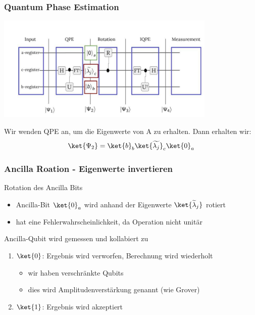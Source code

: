\begin{frame}
    \frametitle{Quantum Phase Estimation}
    \begin{center}
    \includegraphics[width=10.5cm]{img/hhl_circuit/hhl_circuit_2.jpg}
    \end{center}

    Wir wenden QPE an, um die Eigenwerte von A zu erhalten.
    Dann erhalten wir:
    $$\ket{\Psi_2} = \ket{b}_b \ket{\widetilde{\lambda_j}}_c\ket{0}_a$$


\end{frame}


\begin{frame}
    \frametitle{Ancilla Roation - Eigenwerte invertieren}

    Rotation des Ancilla Bits
    \begin{itemize}
        \item Ancilla-Bit $\ket{0}_a$ wird anhand der Eigenwerte $\ket{ \widetilde{\lambda}_j}$ rotiert
        \item hat eine Fehlerwahrscheinlichkeit, da Operation nicht unitär 
    \end{itemize}

    \hfil

    Ancilla-Qubit wird gemessen und kollabiert zu
    \begin{enumerate}
        \item $\ket{0}$: Ergebnis wird verworfen, Berechnung wird wiederholt
            \begin{itemize}
            \item wir haben verschränkte Qubits
            \item dies wird Amplitudenverstärkung genannt (wie Grover)
            \end{itemize}
        \item $\ket{1}$: Ergebnis wird akzeptiert
    \end{enumerate}

\end{frame}

